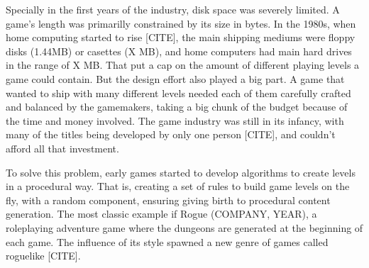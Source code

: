 Specially in the first years of the industry, disk space was severely limited. A game's length was primarilly constrained by its size in bytes. In the 1980s, when home computing started to rise [CITE], the main shipping mediums were floppy disks (1.44MB) or casettes (X MB), and home computers had main hard drives in the range of X MB. That put a cap on the amount of different playing levels a game could contain. But the design effort also played a big part. A game that wanted to ship with many different levels needed each of them carefully crafted and balanced by the gamemakers, taking a big chunk of the budget because of the time and money involved. The game industry was still in its infancy, with many of the titles being developed by only one person [CITE], and couldn't afford all that investment.

To solve this problem, early games started to develop algorithms to create levels in a procedural way. That is, creating a set of rules to build game levels on the fly, with a random component, ensuring  giving birth to procedural content generation. The most classic example if Rogue (COMPANY, YEAR), a roleplaying adventure game where the dungeons are generated at the beginning of each game. The influence of its style spawned a new genre of games called roguelike [CITE].